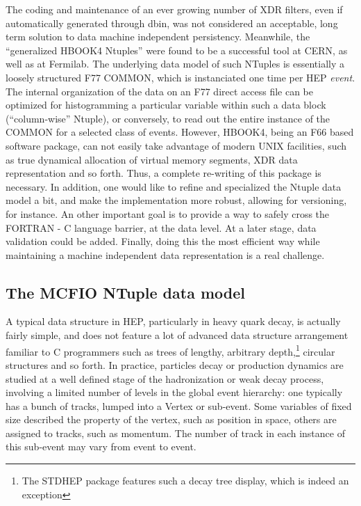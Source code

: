 The coding and maintenance of an ever growing number of XDR filters, even if
automatically generated through dbin, was not considered an acceptable, long
term solution to data machine independent persistency. Meanwhile, the
``generalized HBOOK4 Ntuples'' were found to be a successful tool at CERN, as
well as at Fermilab. The underlying data model of such NTuples is essentially a
loosely structured F77 COMMON, which is instanciated one time per HEP {\em
event}.  The internal organization of the data on an F77 direct access file can
be optimized for histogramming a particular variable within such a data block
(``column-wise'' Ntuple), or  conversely, to read out the entire instance of the
COMMON for a selected  class of events.  However, HBOOK4, being an F66 based
software package, can not easily take advantage of modern UNIX facilities, such as
true dynamical allocation of virtual memory segments, XDR data representation
and  so forth.   Thus, a complete re-writing of this  package is necessary.  In
addition, one would like to refine and specialized the Ntuple data model a bit,
and make the implementation more robust, allowing for versioning, for
instance.  An other important goal is to provide a way to safely cross  the
FORTRAN - C language barrier, at the data level.   At a later stage, data
validation could be added.  Finally, doing this the most efficient way
while maintaining a machine independent data representation is a real
challenge.

\subsection{The MCFIO NTuple data model}

A typical data structure in HEP, particularly in heavy quark decay, is
actually fairly simple, and does not feature a lot of advanced data structure
arrangement familiar to C programmers such as trees of lengthy, arbitrary
depth,\footnote{The STDHEP package features such a decay tree display, which
is indeed an exception} circular structures and so forth.  In practice,
particles decay or production dynamics are studied at a well defined stage of
the hadronization or weak decay process, involving a limited number of levels
in the global event hierarchy: one typically has a bunch of tracks, lumped into
a Vertex or sub-event.  Some variables  of fixed size described the property of the vertex,
such as position in space, others are assigned to tracks, such as momentum.
The  number of track in each instance of this sub-event may vary
from event to event.

